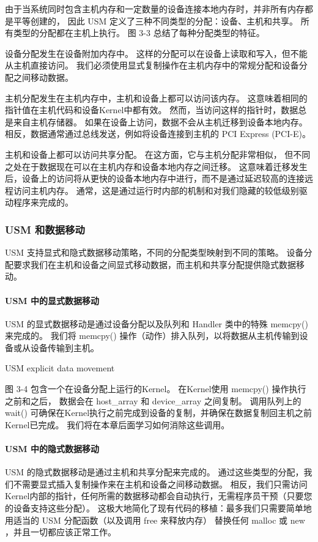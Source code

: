 由于当系统同时包含主机内存和一定数量的设备连接本地内存时，并非所有内存都是平等创建的，
因此 USM 定义了三种不同类型的分配：设备、主机和共享。 所有类型的分配都在主机上执行。 
图 3-3 总结了每种分配类型的特征。

设备分配发生在设备附加内存中。 这样的分配可以在设备上读取和写入，但不能从主机直接访问。 
我们必须使用显式复制操作在主机内存中的常规分配和设备分配之间移动数据。

主机分配发生在主机内存中，主机和设备上都可以访问该内存。 这意味着相同的指针值在主机代码和设备Kernel中都有效。 
然而，当访问这样的指针时，数据总是来自主机存储器。 如果在设备上访问，数据不会从主机迁移到设备本地内存。 
相反，数据通常通过总线发送，例如将设备连接到主机的 PCI Express (PCI-E)。

主机和设备上都可以访问共享分配。 在这方面，它与主机分配非常相似，
但不同之处在于数据现在可以在主机内存和设备本地内存之间迁移。 
这意味着迁移发生后，设备上的访问将从更快的设备本地内存中进行，而不是通过延迟较高的连接远程访问主机内存。 
通常，这是通过运行时内部的机制和对我们隐藏的较低级别驱动程序来完成的。

\subsubsection{USM 和数据移动}
USM 支持显式和隐式数据移动策略，不同的分配类型映射到不同的策略。 
设备分配要求我们在主机和设备之间显式移动数据，而主机和共享分配提供隐式数据移动。

\paragraph{USM 中的显式数据移动}

USM 的显式数据移动是通过设备分配以及队列和 Handler 类中的特殊 memcpy() 来完成的。 
我们将 memcpy() 操作（动作）排入队列，以将数据从主机传输到设备或从设备传输到主机。

{\color{red} USM explicit data movement }

图 3-4 包含一个在设备分配上运行的Kernel。 在Kernel使用 memcpy() 操作执行之前和之后，
数据会在 host\_array 和 device\_array 之间复制。 
调用队列上的 wait() 可确保在Kernel执行之前完成到设备的复制，并确保在数据复制回主机之前Kernel已完成。 
我们将在本章后面学习如何消除这些调用。

\paragraph{USM 中的隐式数据移动}

USM 的隐式数据移动是通过主机和共享分配来完成的。 
通过这些类型的分配，我们不需要显式插入复制操作来在主机和设备之间移动数据。 
相反，我们只需访问Kernel内部的指针，任何所需的数据移动都会自动执行，无需程序员干预（只要您的设备支持这些分配）。 
这极大地简化了现有代码的移植：最多我们只需要简单地用适当的 USM 分配函数（以及调用 free 来释放内存）
替换任何 malloc 或 new ，并且一切都应该正常工作。

